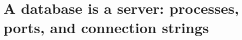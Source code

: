 \chapter{A database is a server: processes, ports, and connection strings}
\label{ch:a-database-is-a-server-processes-ports}


